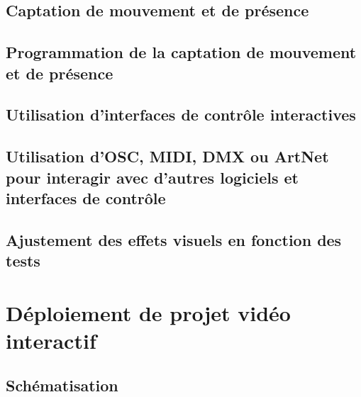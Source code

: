 \documentclass[
]{book}
\begin{document}
\hypertarget{captation-de-mouvement-et-de-pruxe9sence}{%
\section{Captation de mouvement et de présence}\label{captation-de-mouvement-et-de-pruxe9sence}}

\hypertarget{programmation-de-la-captation-de-mouvement-et-de-pruxe9sence}{%
\section{Programmation de la captation de mouvement et de présence}\label{programmation-de-la-captation-de-mouvement-et-de-pruxe9sence}}

\hypertarget{utilisation-dinterfaces-de-contruxf4le-interactives}{%
\section{Utilisation d'interfaces de contrôle interactives}\label{utilisation-dinterfaces-de-contruxf4le-interactives}}

\hypertarget{utilisation-dosc-midi-dmx-ou-artnet-pour-interagir-avec-dautres-logiciels-et-interfaces-de-contruxf4le}{%
\section{Utilisation d'OSC, MIDI, DMX ou ArtNet pour interagir avec d'autres logiciels et interfaces de contrôle}\label{utilisation-dosc-midi-dmx-ou-artnet-pour-interagir-avec-dautres-logiciels-et-interfaces-de-contruxf4le}}

\hypertarget{ajustement-des-effets-visuels-en-fonction-des-tests}{%
\section{Ajustement des effets visuels en fonction des tests}\label{ajustement-des-effets-visuels-en-fonction-des-tests}}

\hypertarget{duxe9ploiement-de-projet-viduxe9o-interactif}{%
\chapter{Déploiement de projet vidéo interactif}\label{duxe9ploiement-de-projet-viduxe9o-interactif}}

\hypertarget{schuxe9matisation}{%
\section{Schématisation}\label{schuxe9matisation}}
\end{document}
